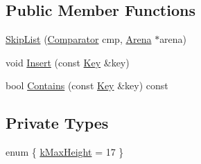 \subsection*{Public Member Functions}
\begin{DoxyCompactItemize}
\item 
\hyperlink{classleveldb_1_1_skip_list_a793060fb1b44b01c6f510aa16387c6ee}{Skip\+List} (\hyperlink{structleveldb_1_1_comparator}{Comparator} cmp, \hyperlink{classleveldb_1_1_arena}{Arena} $\ast$arena)
\item 
void \hyperlink{classleveldb_1_1_skip_list_af1ed755f0825f38272aafe3cae4da644}{Insert} (const \hyperlink{namespaceleveldb_a7e9a9725b13fa0bd922d885280dfab95}{Key} \&key)
\item 
bool \hyperlink{classleveldb_1_1_skip_list_a134b36bafbfecf325bb7b57bc2490f87}{Contains} (const \hyperlink{namespaceleveldb_a7e9a9725b13fa0bd922d885280dfab95}{Key} \&key) const 
\end{DoxyCompactItemize}
\subsection*{Private Types}
\begin{DoxyCompactItemize}
\item 
enum \{ \hyperlink{classleveldb_1_1_skip_list_a2e64dde7e3a6df57e1b4a43ff4ab0ef8a60ca280962bbbc6e8055b14fb11a81b5}{k\+Max\+Height} = 17
 \}
\end{DoxyCompactItemize}
